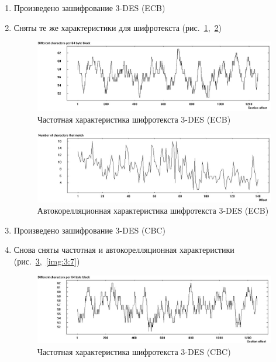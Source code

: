 \documentclass[a4paper, 14pt]{extarticle}
\begin{document}
\begin{enumerate}
\begin{figure}[h]
    \end{figure}
    \FloatBarrier{}
    \item Произведено зашифрование 3-DES (ECB)
    \item Сняты те же характеристики для шифротекста (рис.~\ref{img:3:4},~\ref{img:3:5})
    \begin{figure}[h]
        \centering
        \includegraphics[width=\textwidth]{./img/S014.jpg}
        \caption{Частотная характеристика шифротекста 3-DES (ECB)}%
        \label{img:3:4}
    \end{figure}
    \begin{figure}[h]
        \centering
        \includegraphics[width=\textwidth]{./img/S015.jpg}
        \caption{Автокорелляционная характеристика шифротекста 3-DES (ECB)}%
        \label{img:3:5}
    \end{figure}
    \item Произведено зашифрование 3-DES (CBC)
    \item Снова сняты частотная и автокорелляционная характеристики (рис.~\ref{img:3:6},~\ref{img:3:7})
    \begin{figure}[h]
        \centering
        \includegraphics[width=\textwidth]{./img/S016.jpg}
        \caption{Частотная характеристика шифротекста 3-DES (CBC)}%
        \label{img:3:6}
    \end{figure}

\end{enumerate}
\end{document}
